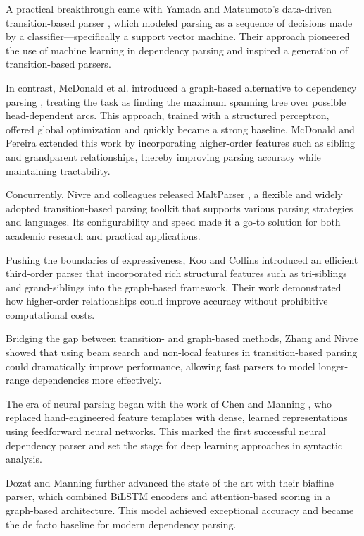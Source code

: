 A practical breakthrough came with Yamada and Matsumoto’s data-driven transition-based parser \cite{yamada2003statistical}, which modeled parsing as a sequence of decisions made by a classifier—specifically a support vector machine. Their approach pioneered the use of machine learning in dependency parsing and inspired a generation of transition-based parsers.

In contrast, McDonald et al. introduced a graph-based alternative to dependency parsing \cite{mcdonald2005online}, treating the task as finding the maximum spanning tree over possible head-dependent arcs. This approach, trained with a structured perceptron, offered global optimization and quickly became a strong baseline. McDonald and Pereira \cite{mcdonald2006online} extended this work by incorporating higher-order features such as sibling and grandparent relationships, thereby improving parsing accuracy while maintaining tractability.

Concurrently, Nivre and colleagues released MaltParser \cite{nivre2006maltparser}, a flexible and widely adopted transition-based parsing toolkit that supports various parsing strategies and languages. Its configurability and speed made it a go-to solution for both academic research and practical applications.

Pushing the boundaries of expressiveness, Koo and Collins \cite{koo2010efficient} introduced an efficient third-order parser that incorporated rich structural features such as tri-siblings and grand-siblings into the graph-based framework. Their work demonstrated how higher-order relationships could improve accuracy without prohibitive computational costs.

Bridging the gap between transition- and graph-based methods, Zhang and Nivre \cite{zhang2011transition} showed that using beam search and non-local features in transition-based parsing could dramatically improve performance, allowing fast parsers to model longer-range dependencies more effectively.

The era of neural parsing began with the work of Chen and Manning \cite{chen2014fast}, who replaced hand-engineered feature templates with dense, learned representations using feedforward neural networks. This marked the first successful neural dependency parser and set the stage for deep learning approaches in syntactic analysis.

Dozat and Manning \cite{dozat2017deep} further advanced the state of the art with their biaffine parser, which combined BiLSTM encoders and attention-based scoring in a graph-based architecture. This model achieved exceptional accuracy and became the de facto baseline for modern dependency parsing.

